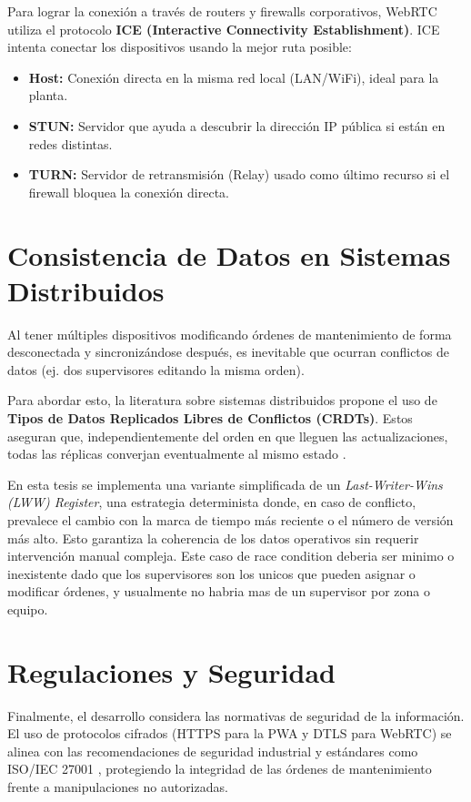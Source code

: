 \documentclass[10pt,a4paper]{report}
\begin{document}
Para lograr la conexión a través de routers y firewalls corporativos, WebRTC utiliza el protocolo \textbf{ICE (Interactive Connectivity Establishment)}. ICE intenta conectar los dispositivos usando la mejor ruta posible:
\begin{itemize}
    \item \textbf{Host:} Conexión directa en la misma red local (LAN/WiFi), ideal para la planta.
    \item \textbf{STUN:} Servidor que ayuda a descubrir la dirección IP pública si están en redes distintas.
    \item \textbf{TURN:} Servidor de retransmisión (Relay) usado como último recurso si el firewall bloquea la conexión directa.
\end{itemize}

\section*{Consistencia de Datos en Sistemas Distribuidos}
Al tener múltiples dispositivos modificando órdenes de mantenimiento de forma desconectada y sincronizándose después, es inevitable que ocurran conflictos de datos (ej. dos supervisores editando la misma orden).

Para abordar esto, la literatura sobre sistemas distribuidos propone el uso de \textbf{Tipos de Datos Replicados Libres de Conflictos (CRDTs)}. Estos aseguran que, independientemente del orden en que lleguen las actualizaciones, todas las réplicas converjan eventualmente al mismo estado \cite{Shapiro2011_CRDT}.

En esta tesis se implementa una variante simplificada de un \textit{Last-Writer-Wins (LWW) Register}, una estrategia determinista donde, en caso de conflicto, prevalece el cambio con la marca de tiempo más reciente o el número de versión más alto. Esto garantiza la coherencia de los datos operativos sin requerir intervención manual compleja. Este caso de race condition deberia ser minimo o inexistente dado que los supervisores son los unicos que pueden asignar o modificar órdenes, y usualmente no habria mas de un supervisor por zona o equipo.

\section*{Regulaciones y Seguridad}
Finalmente, el desarrollo considera las normativas de seguridad de la información. El uso de protocolos cifrados (HTTPS para la PWA y DTLS para WebRTC) se alinea con las recomendaciones de seguridad industrial y estándares como ISO/IEC 27001 \cite{ISO27001:2022}, protegiendo la integridad de las órdenes de mantenimiento frente a manipulaciones no autorizadas.
\end{document}
